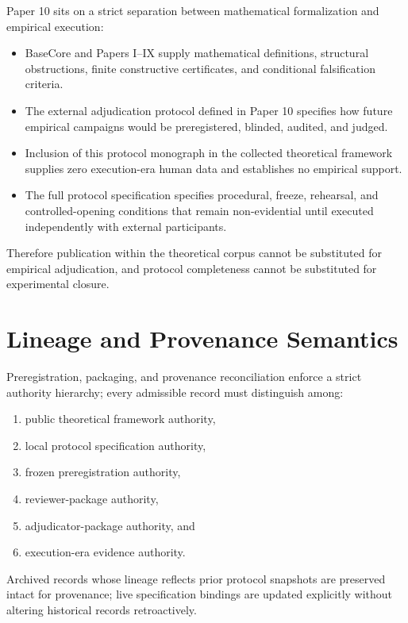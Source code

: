 \documentclass[11pt,a4paper]{article}
\begin{document}
Paper 10 sits on a strict separation between mathematical formalization and empirical execution:

\begin{itemize}
\item BaseCore and Papers I--IX supply mathematical definitions, structural obstructions, finite constructive certificates, and conditional falsification criteria.
\item The external adjudication protocol defined in Paper 10 specifies how future empirical campaigns would be preregistered, blinded, audited, and judged.
\item Inclusion of this protocol monograph in the collected theoretical framework supplies zero execution-era human data and establishes no empirical support.
\item The full protocol specification specifies procedural, freeze, rehearsal, and controlled-opening conditions that remain non-evidential until executed independently with external participants.
\end{itemize}

Therefore publication within the theoretical corpus cannot be substituted for empirical adjudication,
and protocol completeness cannot be substituted for experimental closure.

\section{Lineage and Provenance Semantics}

Preregistration, packaging, and provenance reconciliation enforce a strict authority hierarchy; every admissible record must distinguish among:

\begin{enumerate}
\item public theoretical framework authority,
\item local protocol specification authority,
\item frozen preregistration authority,
\item reviewer-package authority,
\item adjudicator-package authority, and
\item execution-era evidence authority.
\end{enumerate}

Archived records whose lineage reflects prior protocol snapshots are preserved intact for provenance; live specification bindings are updated explicitly without altering historical records retroactively.
\end{document}

